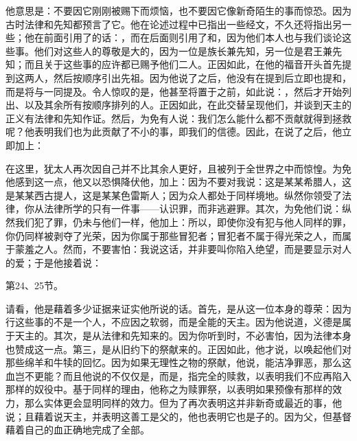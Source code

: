 \par

他意思是：不要因它刚刚被赐下而烦恼，也不要因它像新奇陌生的事而惊恐。因为古时法律和先知都预言了它。他在论述过程中已指出一些经文，不久还将指出另一些；他在前面引用了的话：，而在后面则引用了和，因为他们本人也与我们谈论这些事。他们对这些人的尊敬是大的，因为一位是族长兼先知，另一位是君王兼先知；而且关于这些事的应许都已赐予他们二人。正因如此，在他的福音开头首先提到这两人，然后按顺序引出先祖。因为他说了之后，他没有在提到后立即也提和，而是将与一同提及。令人惊叹的是，他甚至将置于之前，如此说：，然后才开始列出、以及其余所有按顺序排列的人。正因如此，在此交替呈现他们，并谈到天主的正义有法律和先知作证。然后，为免有人说：我们怎么能什么都不贡献就得到拯救呢？他表明我们也为此贡献了不小的事，即我们的信德。因此，在说了之后，他立即加上：\par

在这里，犹太人再次因自己并不比其余人更好，且被列于全世界之中而惊惶。为免他感到这一点，他又以恐惧降伏他，加上：因为不要对我说：这是某某希腊人，这是某某西古提人，这是某某色雷斯人；因为众人都处于同样境地。纵然你领受了法律，你从法律所学的只有一件事——认识罪，而非逃避罪。其次，为免他们说：纵然我们犯了罪，仍未与他们一样，他加上：所以，即使你没有犯与他人同样的罪，你仍同样被剥夺了光荣，因为你属于那些冒犯者；冒犯者不属于得光荣之人，而属于蒙羞之人。然而，不要害怕：我说这话，并非要叫你陷入绝望，而是要显示对人的爱；于是他接着说：\par

第24、25节。\par

请看，他是藉着多少证据来证实他所说的话。首先，是从这一位本身的尊荣：因为行这些事的不是一个人，不应因之软弱，而是全能的天主。因为他说道，义德是属于天主的。其次，是从法律和先知来的。因为你听到时，不必害怕，因为法律本身也赞成这一点。第三，是从旧约下的祭献来的。正因如此，他才说，以唤起他们对那些绵羊和牛犊的回忆。因为如果无理性之物的祭献，他说，能洁净罪恶，那么这血岂不更能？而且他说的不仅仅是，而是，指完全的赎救，以表明我们不应再陷入那样的奴役中。基于同样的理由，他称之为赎罪祭，以表明如果预像有那样的效力，那么实体更会显明同样的效力。但为了再次表明这并非新奇或最近的事，他说；且藉着说天主，并表明这善工是父的，他也表明它也是子的。因为父，但基督藉着自己的血正确地完成了全部。\par

